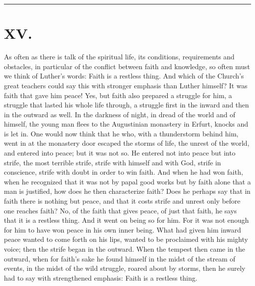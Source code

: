 \documentclass[12pt]{book}
\newcommand{\opage}[1]{\marginnote{\footnotesize\textit{[#1]}}}
\begin{document}
\begin{center}\rule{3cm}{0.4pt}\end{center}

\chapter*{XV.}
\label{ch:xv}
\opage{256}\setcounter{footnote}{0}%
As often as there is talk of the spiritual life, its conditions, requirements
and obstacles, in particular of the conflict between faith and knowledge, so
often must we think of Luther's words: Faith is a restless thing. And which of
the Church's great teachers could say this with stronger emphasis than Luther
himself? It was faith that gave him peace! Yes, but faith also prepared a
struggle for him, a struggle that lasted his whole life through, a struggle
first in the inward and then in the outward as well. In the darkness of night,
in dread of the world and of himself, the young man flees to the Augustinian
monastery in Erfurt, knocks and is let in. One would now think that he who,
with a thunderstorm behind him, went in at the monastery door escaped the
storms of life, the unrest of the world, and entered into peace; but it was
not so. He entered not into peace but into strife, the most terrible strife,
strife with himself and with God, strife in conscience, strife with doubt in
order to win faith. And when he had won faith, when he recognized that it was
not by papal good works but by faith alone that a man is justified, how does
he then characterize faith? Does he perhaps say that in faith there is nothing
but peace, and that it costs strife and unrest only before one reaches faith?
No, of the faith that
\opage{257}\setcounter{footnote}{0}%
gives peace, of just that faith, he says that it is a restless thing. And it
went on being so for him. For it was not enough for him to have won peace in
his own inner being. What had given him inward peace wanted to come forth on
his lips, wanted to be proclaimed with his mighty voice; then the strife began
in the outward. When the tempest then came in the outward, when for faith's
sake he found himself in the midst of the stream of events, in the midst of the
wild struggle, roared about by storms, then he surely had to say with
strengthened emphasis: Faith is a restless thing.
\end{document}
